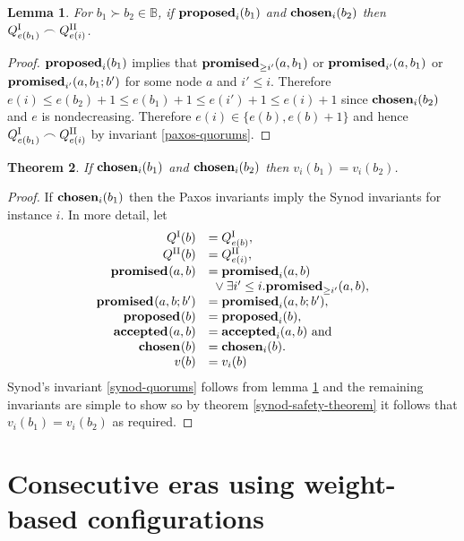 \documentclass[journal]{IEEEtran}
\newtheorem{theorem}{Theorem}
\newtheorem{lemma}[theorem]{Lemma}
\begin{document}
\begin{lemma}\label{paxos-synod-quorum-invariant} For $b_1 \succ b_2 \in
\mathbb B$, if $\mathbf{proposed}_{i}(b_1)$ and $\mathbf{chosen}_{i}(b_2)$ then
${{Q}^\textrm{I}_{e(b_1)} \frown {Q}^\textrm{II}_{e(i)}}$.  \end{lemma}

\begin{proof} $\mathbf{proposed}_{i}(b_1)$ implies that $\mathbf{promised}_{\ge i'}(a,b_1)$ or
$\mathbf{promised}_{i'}(a,b_1)$ or $\mathbf{promised}_{i'}(a,b_1;b')$ for some node $a$ and $i' \le
i$. Therefore $e(i) \le e(b_2) + 1 \le e(b_1) + 1 \le e(i') + 1 \le e(i) + 1$
since $\mathbf{chosen}_{i}(b_2)$ and $e$ is nondecreasing.  Therefore $e(i) \in \{ e(b),
e(b) + 1 \}$ and hence ${{Q}^\textrm{I}_{e(b_1)} \frown {Q}^\textrm{II}_{e(i)}}$ by invariant
\ref{paxos-quorums}.  \end{proof}

\begin{theorem}\label{paxos-safety-theorem} If $\mathbf{chosen}_{i}(b_1)$ and
$\mathbf{chosen}_{i}(b_2)$ then ${v_i(b_1) = v_i(b_2)}$.  \end{theorem}

\begin{proof} If $\mathbf{chosen}_{i}(b_1)$ then the Paxos invariants imply the Synod
invariants for instance $i$.  In more detail, let
\[\begin{array}{rl}
Q^\textrm{I}(b) &= {Q}^\textrm{I}_{e(b)}, \\
Q^\textrm{II}(b) &= {Q}^\textrm{II}_{e(i)}, \\
\mathbf{promised}_{}(a,b) &= \mathbf{promised}_{i}(a,b) \\
& \ {}\vee \exists i' \le i. \mathbf{promised}_{\ge i'}(a,b), \\
\mathbf{promised}_{}(a,b;b') &= \mathbf{promised}_{i}(a,b;b'), \\
\mathbf{proposed}_{}(b) &= \mathbf{proposed}_{i}(b), \\
\mathbf{accepted}_{}(a,b) &= \mathbf{accepted}_{i}(a,b) \textrm{ and} \\
\mathbf{chosen}_{}(b) &= \mathbf{chosen}_{i}(b). \\
v(b) &= v_i(b)\\
\end{array}
\]
Synod's invariant \ref{synod-quorums} follows from lemma
\ref{paxos-synod-quorum-invariant} and the remaining invariants are simple to
show so by theorem \ref{synod-safety-theorem} it follows that $v_i(b_1) =
v_i(b_2)$ as required.  \end{proof}

\section{Consecutive eras using weight-based configurations}
\end{document}
